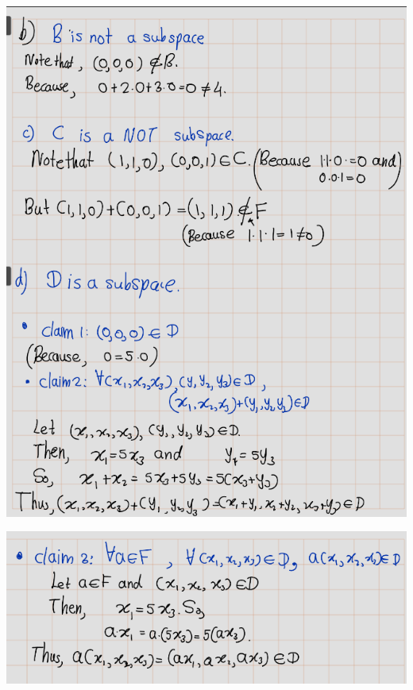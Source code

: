 \documentclass[
]{book}
\theoremstyle{definition}
\theoremstyle{definition}
\theoremstyle{definition}
\theoremstyle{definition}
\theoremstyle{remark}
\begin{document}
\includegraphics[width=9.12in]{fig/Ex1C/Ex1-2}

\includegraphics[width=8.89in]{fig/Ex1C/Ex1-3}

  
\end{document}
